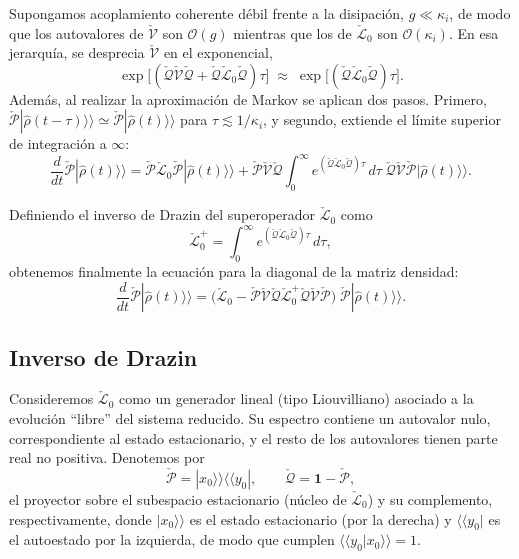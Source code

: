 \begin{appendixs}
Supongamos acoplamiento coherente débil frente a la disipación,
$g\ll \kappa_i$, de modo que los autovalores de
$\check{\mathcal{V}}$ son $\mathcal{O}(g)$ mientras que los de
$\check{\mathcal{L}}_{0}$ son $\mathcal{O}(\kappa_i)$. En esa jerarquía,
se desprecia $\check{\mathcal{V}}$ en el exponencial,
\[
\exp\!\big[(\check{\mathcal{Q}}\check{\mathcal{V}}\check{\mathcal{Q}}
+\check{\mathcal{Q}}\check{\mathcal{L}}_{0}\check{\mathcal{Q}})\tau\big]
\;\approx\;
\exp\!\big[(\check{\mathcal{Q}}\check{\mathcal{L}}_{0}\check{\mathcal{Q}})\tau\big].
\]
Además, al realizar la aproximación de Markov se aplican dos pasos. Primero,
$\check{\mathcal{P}}|\hat{\rho}(t-\tau)\rangle\rangle\simeq
\check{\mathcal{P}}|\hat{\rho}(t)\rangle\rangle$ para $\tau\lesssim 1/\kappa_i$,
y segundo, extiende el límite superior de integración a $\infty$:
\begin{equation*}
    \frac{d}{dt}\check{\mathcal{P}}|\hat{\rho}(t)\rangle\rangle
    =\check{\mathcal{P}}\check{\mathcal{L}}_{0}\check{\mathcal{P}}|\hat{\rho}(t)\rangle\rangle
     +\check{\mathcal{P}}\check{\mathcal{V}}\check{\mathcal{Q}}
      \int_{0}^{\infty}\!e^{(\check{\mathcal{Q}}\check{\mathcal{L}}_{0}\check{\mathcal{Q}})\tau}\,d\tau\;
      \check{\mathcal{Q}}\check{\mathcal{V}}\check{\mathcal{P}}
      |\hat{\rho}(t)\rangle\rangle .
\end{equation*}

Definiendo el inverso de Drazin del superoperador $\check{\mathcal{L}}_{0}$ como
\[
\check{\mathcal{L}}_{0}^{+}
=\int_{0}^{\infty}\!e^{(\check{\mathcal{Q}}\check{\mathcal{L}}_{0}\check{\mathcal{Q}})\tau}\,d\tau,
\]
obtenemos finalmente la ecuación para la diagonal de la matriz densidad:
\begin{equation*}
    \frac{d}{dt}\check{\mathcal{P}}|\hat{\rho}(t)\rangle\rangle
    =\big(\check{\mathcal{L}}_{0}
      -\check{\mathcal{P}}\check{\mathcal{V}}\check{\mathcal{Q}}
       \check{\mathcal{L}}_{0}^{+}\check{\mathcal{Q}}\check{\mathcal{V}}\check{\mathcal{P}}\big)\;
      \check{\mathcal{P}}|\hat{\rho}(t)\rangle\rangle .
\end{equation*}

\label{appendix5clasic}

\subsection{Inverso de Drazin}
Consideremos $\check{\mathcal{L}}_{0}$ como un generador lineal (tipo Liouvilliano) asociado a la evolución
``libre'' del sistema reducido. Su espectro contiene un autovalor nulo, correspondiente al estado
estacionario, y el resto de los autovalores tienen parte real no positiva. Denotemos por
\[
\check{\mathcal{P}} = |x_{0}\rangle\rangle\langle\langle y_{0}|, \qquad
\check{\mathcal{Q}} = \mathbf{1}-\check{\mathcal{P}},
\]
el proyector sobre el subespacio estacionario (núcleo de $\check{\mathcal{L}}_{0}$) y su complemento,
respectivamente, donde $|x_{0}\rangle\rangle$ es el estado estacionario (por la derecha) y
$\langle\langle y_{0}|$ es el autoestado por la izquierda, de modo que cumplen
$\langle\langle y_{0}|x_{0}\rangle\rangle=1$.


\end{appendixs}
